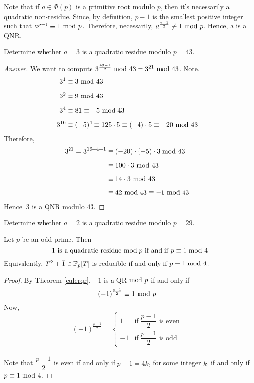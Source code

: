 \vspace*{1em}

\begin{remark}
Note that if $a \in \Phi(p)$ is a primitive root modulo $p$, then it's necessarily a quadratic non-residue. Since, by definition, $p-1$ is the smallest positive integer such that $a^{p-1} \equiv 1 \text{ mod }{p}$. Therefore, necessarily, $a^{\frac{p-1}{2}} \not\equiv 1 \text{ mod }{p}$. Hence, $a$ is a QNR.
\end{remark}

\vspace*{1.5em}

\begin{example} 
Determine whether $a = 3$ is a quadratic residue modulo $p = 43$.
\end{example}
\begin{proof}[Answer]
We want to compute $3^{\frac{43-1}{2}}\text{ mod }{43} = 3^{21}\text{ mod }{43}$. Note,
\allowdisplaybreaks
\begin{align*}
3^1 &\equiv 3 \text{ mod }{43}\\[0.5em]
3^2 &\equiv 9 \text{ mod }{43}\\[0.5em]
3^4 &\equiv 81 \equiv -5 \text{ mod }{43}\\[0.5em]
3^{16} &\equiv (-5)^4 \equiv 125\cdot 5 \equiv(-4)\cdot 5 \equiv-20 \text{ mod }{43}
\end{align*}
Therefore,
\begin{align*}
3^{21} = 3^{16+4+1} &\equiv (-20)\cdot (-5)\cdot 3\text{ mod }{43}\\[0.5em]
&\equiv 100\cdot 3\text{ mod }{43}\\[0.5em]
&\equiv 14\cdot 3\text{ mod }{43}\\[0.5em]
&\equiv 42\text{ mod }{43} \equiv -1\text{ mod }{43}
\end{align*}
Hence, $3$ is a QNR modulo $43$.
\end{proof}

\vspace*{1.5em}

\begin{example}[in-class]
Determine whether $a = 2$ is a quadratic residue modulo $p = 29$.
\end{example}

\vspace*{1em}

\begin{corollary}\label{qrl1}
Let $p$ be an odd prime. Then
\[-1\text{ is a quadratic residue$\text{ mod }{p}$ if and if $p \equiv 1 \text{ mod }{4}$}\]
Equivalently, $T^2 + \overline{1} \in \mathbb F_p[T]$ is reducible if and only if $p \equiv 1 \text{ mod }{4}$.
\end{corollary}
\begin{proof}
By Theorem \ref{eulerqr}, $-1$ is a QR$\text{ mod }{p}$ if and only if
\[(-1)^{\frac{p-1}{2}} \equiv 1\text{ mod }{p}\]
Now, 
\[(-1)^{\frac{p-1}{2}} = \begin{cases}1 & \text{if $\dfrac{p-1}{2}$ is even}\\[1.5em] -1 & \text{if $\dfrac{p-1}{2}$ is odd} \end{cases}\]\\[0.2em]
Note that $\dfrac{p-1}{2}$ is even if and only if $p-1 = 4k$, for some integer $k$, if and only if $p \equiv 1 \text{ mod }{4}$.
\end{proof}

